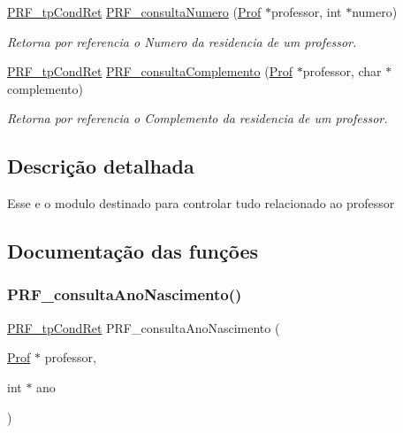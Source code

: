 \begin{DoxyCompactItemize}
\hyperlink{group__modulo_professor_ga777e215896d573d2e99d98793b1f0ed1}{P\+R\+F\+\_\+tp\+Cond\+Ret} \hyperlink{group__funcoes_consulta_gae4861c93c873d1372539f5914cd11625}{P\+R\+F\+\_\+consulta\+Numero} (\hyperlink{structprof}{Prof} $\ast$professor, int $\ast$numero)
\begin{DoxyCompactList}\small\item\em Retorna por referencia o Numero da residencia de um professor. \end{DoxyCompactList}\item 
\hyperlink{group__modulo_professor_ga777e215896d573d2e99d98793b1f0ed1}{P\+R\+F\+\_\+tp\+Cond\+Ret} \hyperlink{group__funcoes_consulta_gab09104ea8ee52509a53b8d548441a120}{P\+R\+F\+\_\+consulta\+Complemento} (\hyperlink{structprof}{Prof} $\ast$professor, char $\ast$complemento)
\begin{DoxyCompactList}\small\item\em Retorna por referencia o Complemento da residencia de um professor. \end{DoxyCompactList}\end{DoxyCompactItemize}


\subsection{Descrição detalhada}
Esse e o modulo destinado para controlar tudo relacionado ao professor 

\subsection{Documentação das funções}
\mbox{\label{group__funcoes_consulta_ga80b3e3e5dfb090a9c28280073cd471f5}} 
\subsubsection{\texorpdfstring{P\+R\+F\+\_\+consulta\+Ano\+Nascimento()}{PRF\_consultaAnoNascimento()}}
{\footnotesize\ttfamily \hyperlink{group__modulo_professor_ga777e215896d573d2e99d98793b1f0ed1}{P\+R\+F\+\_\+tp\+Cond\+Ret} P\+R\+F\+\_\+consulta\+Ano\+Nascimento (\begin{DoxyParamCaption}\item[{\hyperlink{structprof}{Prof} $\ast$}]{professor,  }\item[{int $\ast$}]{ano }\end{DoxyParamCaption})}



